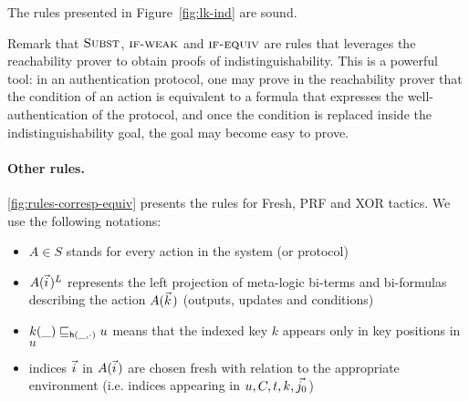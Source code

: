 \begin{lemma}
  The rules presented in Figure~\ref{fig:lk-ind} are sound.
\end{lemma}

Remark that $\textsc{Subst}$,  $\textsc{if-weak}$ and $\textsc{if-equiv}$ are rules that leverages the reachability prover to obtain proofs of indistinguishability. This is a powerful tool: in an authentication protocol, one may prove in the reachability prover that the condition of an action is equivalent to a formula that expresses the well-authentication of the protocol, and once the condition is replaced inside the indistinguishability goal, the goal may become easy to prove.

\paragraph{Other rules.}

\cref{fig:rules-corresp-equiv} presents the rules for Fresh, PRF and XOR tactics.
We use the following notations:
\begin{itemize}
\item $A \in S$ stands for every action in the system (or protocol)
\item $A(\pvec i)^L$ represents the left projection of meta-logic bi-terms and bi-formulas describing the action $A(\pvec k)$ (outputs, updates and conditions)
\item $k(\_) \sqsubseteq_{\mathsf{h}(\_,\cdot)} u$ means that the indexed key $k$ appears only in key positions in $u$
\item indices $\pvec i$ in $A(\pvec i)$ are chosen fresh with relation to the appropriate environment (i.e. indices appearing in $u, C, t, k, \pvec {j_0}$)
\end{itemize}

